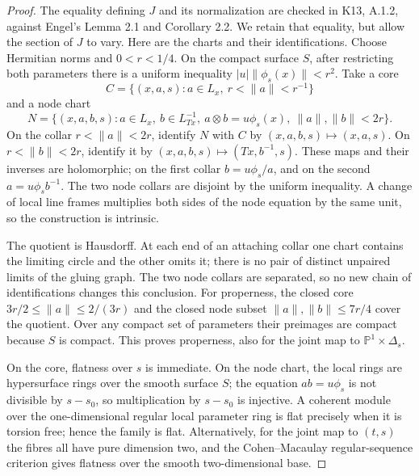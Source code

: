 \begin{proof}
The equality defining $J$ and its normalization are checked in
K13, A.1.2, against Engel's Lemma 2.1 and Corollary 2.2. We retain
that equality, but allow the section of $J$ to vary. Here are the
charts and their identifications. Choose Hermitian norms and
$0<r<1/4$. On the compact surface $S$, after restricting both
parameters there is a uniform inequality
$|u|\|\phi_s(x)\|<r^2$. Take a core
\[
 C=\{(x,a,s):a\in L_x,\ r<\|a\|<r^{-1}\}
\]
and a node chart
\[
 N=\{(x,a,b,s):a\in L_x,\ b\in L^{-1}_{Tx},\
           a\otimes b=u\phi_s(x),\ \|a\|,\|b\|<2r\}.
\]
On the collar $r<\|a\|<2r$, identify $N$ with $C$ by
$(x,a,b,s)\mapsto(x,a,s)$. On $r<\|b\|<2r$, identify it by
$(x,a,b,s)\mapsto(Tx,b^{-1},s)$. These maps and their inverses are
holomorphic; on the first collar $b=u\phi_s/a$, and on the second
$a=u\phi_s b^{-1}$. The two node collars are disjoint by the
uniform inequality. A change of local line frames multiplies both
sides of the node equation by the same unit, so the construction is
intrinsic.

The quotient is Hausdorff. At each end of an attaching collar one
chart contains the limiting circle and the other omits it; there is
no pair of distinct unpaired limits of the gluing graph. The two
node collars are separated, so no new chain of identifications
changes this conclusion. For properness, the closed core
$3r/2\leq\|a\|\leq2/(3r)$ and the closed node subset
$\|a\|,\|b\|\leq7r/4$ cover the quotient. Over any compact set
of parameters their preimages are compact because $S$ is compact.
This proves properness, also for the joint map to
$\mathbb P^1\times\Delta_s$.

On the core, flatness over $s$ is immediate. On the node chart, the
local rings are hypersurface rings over the smooth surface $S$;
the equation $ab=u\phi_s$ is not divisible by $s-s_0$, so
multiplication by $s-s_0$ is injective. A coherent module over the
one-dimensional regular local parameter ring is flat precisely
when it is torsion free; hence the family is flat. Alternatively,
for the joint map to $(t,s)$ the fibres all have pure dimension
two, and the Cohen--Macaulay regular-sequence criterion gives
flatness over the smooth two-dimensional base.


\end{proof}
